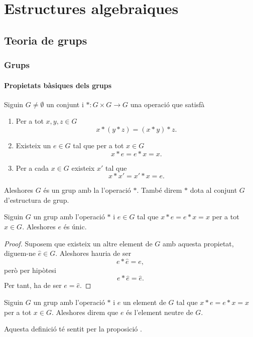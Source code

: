 \documentclass[../Apunts.tex]{subfiles}
\begin{document}
\part{Estructures algebraiques}
\chapter{Teoria de grups}
	\section{Grups}
	\subsection{Propietats bàsiques dels grups}
	\begin{definition}[Grup]
		\label{def:grup}
		Siguin \(G\neq\emptyset\) un conjunt i \(\ast\colon G\times G\to G\) una operació que satisfà
		\begin{enumerate}
			\item Per a tot \(x,y,z\in G\)
			\[x\ast(y\ast z)=(x\ast y)\ast z.\]
			\item Existeix un \(e\in G\) tal que per a tot \(x\in G\)
			\[x\ast e=e\ast x=x.\]
			\item Per a cada \(x\in G\) existeix \(x'\) tal que
			\[x\ast x'=x'\ast x=e.\]
		\end{enumerate}
		Aleshores \(G\) és un grup amb la l'operació \(\ast\). També direm \(\ast\) dota al conjunt \(G\) d'estructura de grup.
	\end{definition}
	\begin{proposition}
		\label{prop:unicitat neutre del grup}
		Siguin \(G\) un grup amb l'operació \(\ast\) i \(e\in G\) tal que \(x\ast e=e\ast x=x\) per a tot \(x\in G\). Aleshores \(e\) és únic.
		\begin{proof}
			Suposem que existeix un altre element de \(G\) amb aquesta propietat, diguem-ne \(\hat{e}\in G\). Aleshores hauria de ser
			\[e\ast\hat{e}=e,\]
			però per hipòtesi
			\[e\ast\hat{e}=\hat{e}.\]
			Per tant, ha de ser \(e=\hat{e}\).
		\end{proof}
	\end{proposition}
	\begin{definition}
		\label{def:l'element neutre del grup}
		Siguin \(G\) un grup amb l'operació \(\ast\) i \(e\) un element de \(G\) tal que \(x\ast e=e\ast x=x\) per a tot \(x\in G\). Aleshores direm que \(e\) és l'element neutre de \(G\).
		
		Aquesta definició té sentit per la proposició .
	\end{definition}
\end{document}
